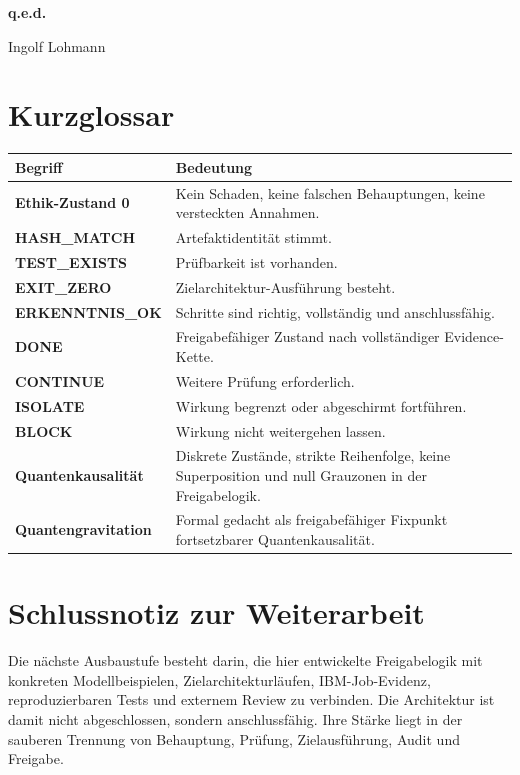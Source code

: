 \documentclass[11pt,a4paper,oneside]{book}
\begin{document}
\begin{center}
\Large\bfseries q.e.d.\par
\vspace{2mm}
Ingolf Lohmann
\end{center}

\backmatter
\chapter*{Kurzglossar}

\begin{longtable}{>{\bfseries}p{}p{}}
\toprule
Begriff & Bedeutung \\
\midrule
Ethik-Zustand 0 & Kein Schaden, keine falschen Behauptungen, keine versteckten Annahmen. \\
HASH\_MATCH & Artefaktidentität stimmt. \\
TEST\_EXISTS & Prüfbarkeit ist vorhanden. \\
EXIT\_ZERO & Zielarchitektur-Ausführung besteht. \\
ERKENNTNIS\_OK & Schritte sind richtig, vollständig und anschlussfähig. \\
DONE & Freigabefähiger Zustand nach vollständiger Evidence-Kette. \\
CONTINUE & Weitere Prüfung erforderlich. \\
ISOLATE & Wirkung begrenzt oder abgeschirmt fortführen. \\
BLOCK & Wirkung nicht weitergehen lassen. \\
Quantenkausalität & Diskrete Zustände, strikte Reihenfolge, keine Superposition und null Grauzonen in der Freigabelogik. \\
Quantengravitation & Formal gedacht als freigabefähiger Fixpunkt fortsetzbarer Quantenkausalität. \\
\bottomrule
\end{longtable}

\chapter*{Schlussnotiz zur Weiterarbeit}

Die nächste Ausbaustufe besteht darin, die hier entwickelte Freigabelogik mit konkreten Modellbeispielen, Zielarchitekturläufen, IBM-Job-Evidenz, reproduzierbaren Tests und externem Review zu verbinden. Die Architektur ist damit nicht abgeschlossen, sondern anschlussfähig. Ihre Stärke liegt in der sauberen Trennung von Behauptung, Prüfung, Zielausführung, Audit und Freigabe.
\end{document}
